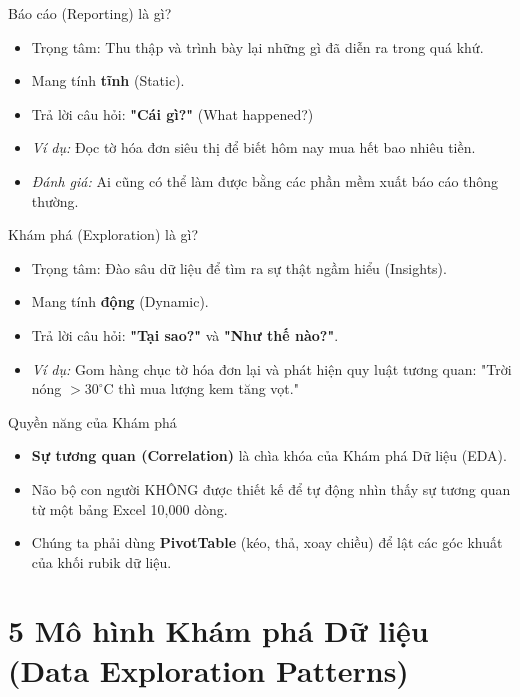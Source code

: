 \documentclass[aspectratio=169,12pt]{beamer}
\begin{document}
\begin{frame}{Báo cáo (Reporting) là gì?}
    \begin{itemize}
        \item Trọng tâm: Thu thập và trình bày lại những gì đã diễn ra trong quá khứ.
        \item Mang tính \textbf{tĩnh} (Static).
        \item Trả lời câu hỏi: \textbf{"Cái gì?"} (What happened?)
        \item \textit{Ví dụ:} Đọc tờ hóa đơn siêu thị để biết hôm nay mua hết bao nhiêu tiền.
        \item \textit{Đánh giá:} Ai cũng có thể làm được bằng các phần mềm xuất báo cáo thông thường.
    \end{itemize}
\end{frame}

\begin{frame}{Khám phá (Exploration) là gì?}
    \begin{itemize}
        \item Trọng tâm: Đào sâu dữ liệu để tìm ra sự thật ngầm hiểu (Insights).
        \item Mang tính \textbf{động} (Dynamic).
        \item Trả lời câu hỏi: \textbf{"Tại sao?"} và \textbf{"Như thế nào?"}.
        \item \textit{Ví dụ:} Gom hàng chục tờ hóa đơn lại và phát hiện quy luật tương quan: "Trời nóng $>30^\circ\mathrm{C}$ thì mua lượng kem tăng vọt."
    \end{itemize}
\end{frame}

\begin{frame}{Quyền năng của Khám phá}
    \begin{itemize}
        \item \textbf{Sự tương quan (Correlation)} là chìa khóa của Khám phá Dữ liệu (EDA).
        \item Não bộ con người KHÔNG được thiết kế để tự động nhìn thấy sự tương quan từ một bảng Excel 10,000 dòng.
        \item Chúng ta phải dùng \textbf{PivotTable} (kéo, thả, xoay chiều) để lật các góc khuất của khối rubik dữ liệu.
    \end{itemize}
\end{frame}


\section{5 Mô hình Khám phá Dữ liệu (Data Exploration Patterns)}
\begin{frame}
    \tableofcontents[currentsection]
\end{frame}
\end{document}
